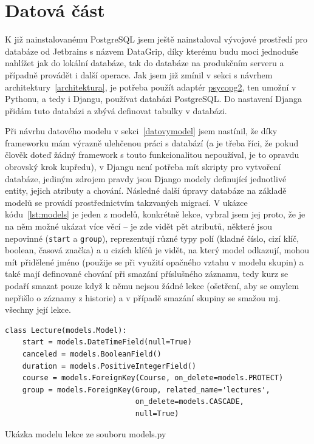     \section{Datová část}\label{sec:datovaCast}
    K již nainstalovanému PostgreSQL jsem ještě nainstaloval vývojové prostředí pro databáze od Jetbrains s názvem DataGrip, díky kterému budu moci jednoduše nahlížet jak do lokální databáze, tak do databáze na produkčním serveru a případně provádět i další operace. Jak jsem již zmínil v sekci s návrhem architektury~\ref{architektura}, je potřeba použít adaptér \href{http://initd.org/psycopg/}{psycopg2}, ten umožní v Pythonu, a tedy i Djangu, používat databázi PostgreSQL. Do nastavení Djanga přidám tuto databázi a zbývá definovat tabulky v databázi.
    
    Při návrhu datového modelu v sekci~\ref{datovymodel} jsem nastínil, že díky frameworku mám výrazně ulehčenou práci s databází (a je třeba říci, že pokud člověk doteď žádný framework s touto funkcionalitou nepoužíval, je to opravdu obrovský krok kupředu), v Djangu není potřeba mít skripty pro vytvoření databáze, jediným zdrojem pravdy jsou Django modely definující jednotlivé entity, jejich atributy a chování. Následné další úpravy databáze na základě modelů se provádí prostřednictvím takzvaných migrací. V ukázce kódu~\ref{lst:models} je jeden z modelů, konkrétně lekce, vybral jsem jej proto, že je na něm možné ukázat více věcí -- je zde vidět pět atributů, některé jsou nepovinné (\verb|start| a \verb|group|), reprezentují různé typy polí (kladné číslo, cizí klíč, boolean, časová značka) a u cizích klíčů je vidět, na který model odkazují, mohou mít přidělené jméno (použije se při využití opačného vztahu v modelu skupin) a také mají definované chování při smazání příslušného záznamu, tedy kurz se podaří smazat pouze když k němu nejsou žádné lekce (ošetření, aby se omylem nepřišlo o záznamy z historie) a v případě smazání skupiny se smažou mj. všechny její lekce.
    
    \begin{listing}[ht]
    	\begin{verbatim}
class Lecture(models.Model):
    start = models.DateTimeField(null=True)
    canceled = models.BooleanField()
    duration = models.PositiveIntegerField()
    course = models.ForeignKey(Course, on_delete=models.PROTECT)
    group = models.ForeignKey(Group, related_name='lectures',
                              on_delete=models.CASCADE,
                              null=True)
    	\end{verbatim}
    	\caption{Ukázka modelu lekce ze souboru models.py}\label{lst:models}
    \end{listing}
    
